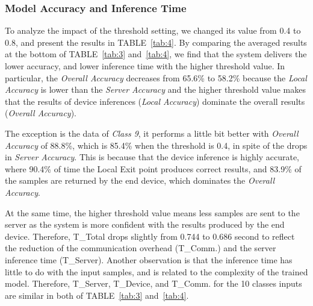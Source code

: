 \documentclass[format=acmsmall, review=false, screen=true]{acmart}
\def\tablename{TABLE}
\begin{document}
\subsubsection{Model Accuracy and Inference Time}
To analyze the impact of the threshold setting, we changed its value from 0.4 to 0.8, and present the results in \tablename~\ref{tab:4}.
By comparing the averaged results at the bottom of \tablename~\ref{tab:3} and~\ref{tab:4}, we find that the system delivers the lower accuracy, and lower inference time with the higher threshold value.
In particular, the \emph{Overall Accuracy} decreases from 65.6\% to 58.2\% because the \emph{Local Accuracy} is lower than the \emph{Server Accuracy} and the higher threshold value makes that the results of device inferences (\emph{Local Accuracy}) dominate the overall results (\emph{Overall Accuracy}).

The exception is the data of \emph{Class 9}, it performs a little bit better with \emph{Overall Accuracy} of 88.8\%, which is 85.4\% when the threshold is 0.4, in spite of the drops in \emph{Server Accuracy}. This is because that the device inference is highly accurate, where 90.4\% of time the Local Exit point produces correct results, and 83.9\% of the samples are returned by the end device, which dominates the \emph{Overall Accuracy}.

At the same time, the higher threshold value means less samples are sent to the server as the system is more confident with the results produced by the end device. Therefore, T\_Total drops slightly from 0.744 to 0.686 second to reflect the reduction of the communication overhead (T\_Comm.) and the server inference time (T\_Server).
Another observation is that the inference time has little to do with the input samples, and is related to the complexity of the trained model. Therefore, T\_Server, T\_Device, and T\_Comm. for the 10 classes inputs are similar in both of \tablename~\ref{tab:3} and~\ref{tab:4}.

\end{document}
